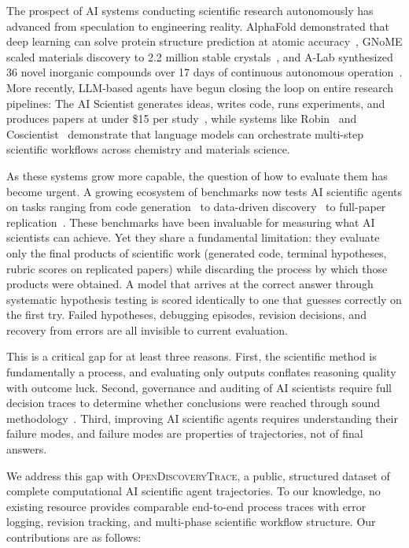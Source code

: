 \documentclass{article}
\newcommand{\dataset}{\textsc{OpenDiscoveryTrace}\xspace}
\begin{document}
The prospect of AI systems conducting scientific research autonomously has advanced from speculation to engineering reality. AlphaFold demonstrated that deep learning can solve protein structure prediction at atomic accuracy~\citep{jumper2021alphafold}, GNoME scaled materials discovery to 2.2 million stable crystals~\citep{merchant2023gnome}, and A-Lab synthesized 36 novel inorganic compounds over 17 days of continuous autonomous operation~\citep{szymanski2023alab}. More recently, LLM-based agents have begun closing the loop on entire research pipelines: The AI Scientist generates ideas, writes code, runs experiments, and produces papers at under \$15 per study~\citep{lu2024aiscientist}, while systems like Robin~\citep{ghareeb2025robin} and Coscientist~\citep{boiko2023coscientist} demonstrate that language models can orchestrate multi-step scientific workflows across chemistry and materials science.

As these systems grow more capable, the question of how to evaluate them has become urgent. A growing ecosystem of benchmarks now tests AI scientific agents on tasks ranging from code generation~\citep{tian2024scicode} to data-driven discovery~\citep{majumder2024discoverybench,chen2025scienceagentbench} to full-paper replication~\citep{starace2025paperbench}. These benchmarks have been invaluable for measuring what AI scientists can achieve. Yet they share a fundamental limitation: they evaluate only the final products of scientific work (generated code, terminal hypotheses, rubric scores on replicated papers) while discarding the process by which those products were obtained. A model that arrives at the correct answer through systematic hypothesis testing is scored identically to one that guesses correctly on the first try. Failed hypotheses, debugging episodes, revision decisions, and recovery from errors are all invisible to current evaluation.

This is a critical gap for at least three reasons. First, the scientific method is fundamentally a process, and evaluating only outputs conflates reasoning quality with outcome luck. Second, governance and auditing of AI scientists require full decision traces to determine whether conclusions were reached through sound methodology~\citep{kapoor2023leakage}. Third, improving AI scientific agents requires understanding their failure modes, and failure modes are properties of trajectories, not of final answers.

We address this gap with \dataset, a public, structured dataset of complete computational AI scientific agent trajectories. To our knowledge, no existing resource provides comparable end-to-end process traces with error logging, revision tracking, and multi-phase scientific workflow structure. Our contributions are as follows:
\end{document}
